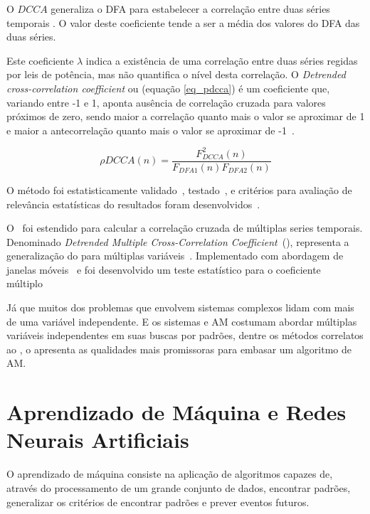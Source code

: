 O \(DCCA\) generaliza o DFA para estabelecer a correlação entre duas séries temporais \cite{Podobnik2008}. O valor deste coeficiente tende a ser a média dos valores do DFA das duas séries. 

Este coeficiente \(\lambda\) indica a existência de uma correlação entre duas séries regidas por leis de potência, mas não quantifica o nível desta correlação. O \emph{Detrended cross-correlation coefficient} ou \pdcca (equação \ref{eq_pdcca}) é um coeficiente que, variando entre -1 e 1, aponta ausência de correlação cruzada para valores próximos de zero, sendo maior a correlação quanto mais o valor se aproximar de 1 e maior a antecorrelação quanto mais o valor se aproximar de -1~\cite{Zebende2011}. 

\begin{equation}
\label{eq_pdcca}
\rho DCCA(n) = \frac{F_{DCCA}^2 (n)}{ F_{DFA1} (n) F_{DFA2} (n)}
\end{equation}

O método foi estatisticamente validado~\cite{PhysRevE.84.066118}, testado~\cite{vassolerZebende2012, Guedes2017, Ferreira2018},
e critérios para avaliação de relevância estatísticas do resultados foram desenvolvidos~\cite{Guedes2018,Guedes2018a}.

O \pdcca~foi estendido para calcular a correlação cruzada de múltiplas series temporais. Denominado \emph{Detrended Multiple Cross-Correlation Coefficient}~(\dmc), representa a generalização do \pdcca para múltiplas variáveis~\cite{Zebende2018}. Implementado com abordagem de janelas móveis~\cite{Guedes2021} e foi desenvolvido um teste estatístico para o coeficiente múltiplo~\cite{DaSilvaFilho2021}

Já que muitos dos problemas que envolvem sistemas complexos lidam com mais de uma variável independente. E os sistemas e AM costumam abordar múltiplas variáveis independentes em suas buscas por padrões, dentre os métodos correlatos ao \pdcca, o \dmc apresenta as qualidades mais promissoras para embasar um algoritmo de AM.

\section{Aprendizado de Máquina e Redes Neurais Artificiais}
\label{sec:ml}

O aprendizado de máquina consiste na aplicação de algoritmos capazes de, através do processamento de um grande conjunto de dados, encontrar padrões, generalizar os critérios de encontrar padrões e prever eventos futuros\cite{bendavid2014}.

